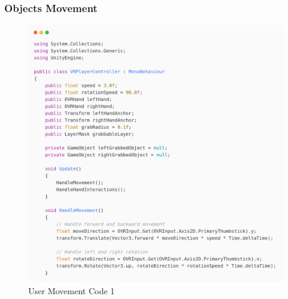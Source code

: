 \subsubsection{Objects Movement}
\newline
\begin{figure}[h]
	\centering
	\includegraphics[width=1\textwidth, height=0.7\textheight]{Images/playerp1.png}
	\caption{User Movement Code 1}
	\label{User Movement Code 1}
\end{figure}
\newpage
{}
\newline

